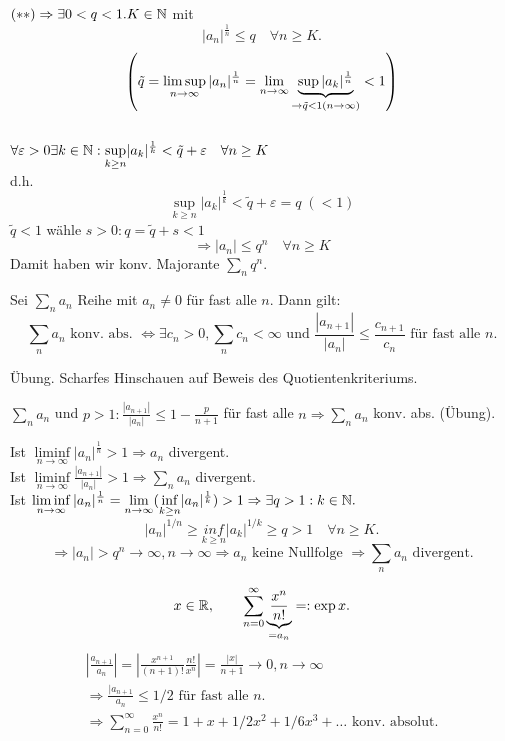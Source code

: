 \begin{bew}
	\( (**) \Rightarrow \exists 0<q<1. K\in\mathbb{N} \) mit \[ |a_n|^{\frac{1}{n}} \leq q \quad\forall n\geq K. \]
	\[\left(\tilde{q} = \limsup \limits_{n\rightarrow\infty} |a_n|^{\frac{1}{n}} = \lim\limits_{n\rightarrow\infty} \underbrace{\sup |a_k|^{\frac{1}{n}}}_{\rightarrow \tilde{q} < 1 (n \rightarrow \infty)}< 1\right)\]\\
	\(\forall \varepsilon > 0 \exists k \in \mathbb{N}: \underset{k \geq n}{\sup} |a_k|^{\frac{1}{k}} < \tilde{q} + \varepsilon \quad \forall n \geq K \)\\
	d.h.\\
	\[\underset{k \geq n}{\sup} |a_k|^{\frac{1}{k}} < \tilde{q} + \varepsilon = q \; (< 1)\]
	\(\tilde{q} < 1\) wähle \(s > 0: q = \tilde{q} + s < 1\)\\
	\[\Rightarrow |a_n| \leq q^n \quad \forall n \geq K \]
	Damit haben wir konv. Majorante \( \sum_n q^n \).
\end{bew}
\begin{satz}
	Sei \( \sum_n a_n \) Reihe mit \(a_n \neq 0 \) für fast alle \(n\). Dann gilt:
	\[ \sum_n a_n \text{ konv. abs. } \Leftrightarrow \exists c_n > 0, \sum_n c_n < \infty \text{ und } \frac{|a_{n+1}|}{|a_n|} \leq \frac{c_{n+1}}{c_n} \text{ für fast alle }n. \]
\end{satz}
\begin{bew}Übung.
	Scharfes Hinschauen auf Beweis des Quotientenkriteriums.
\end{bew}
\begin{kor}
	\( \sum_n a_n \) und \( p>1: \frac{|a_{n+1}|}{|a_n|} \leq 1 - \frac{p}{n+1} \) für fast alle \(n \Rightarrow \sum_n a_n \) konv. abs. (Übung).
\end{kor}
\begin{bem}
	Ist \( \liminf\limits_{n\rightarrow\infty} |a_n|^{\frac{1}{n}} > 1 \Rightarrow a_n \) divergent.\\
	Ist \( \liminf\limits_{n\rightarrow\infty} \frac{|a_{n+1}|}{|a_n|} > 1 \Rightarrow \sum_n a_n \) divergent.\\
	Ist \( \liminf\limits_{n\rightarrow\infty} |a_n|^{\frac{1}{n}} = \lim\limits_{n\rightarrow\infty}(\underset{k\geq n}{\inf} |a_n|^{\frac{1}{k}}) > 1 \Rightarrow \exists q>1: k \in\mathbb{N}.\)
	\[ |a_n|^{1/n} \geq \underset{k\geq n}{inf} |a_k|^{1/k} \geq q > 1 \quad\forall n\geq K. \]
	\[ \Rightarrow |a_n| > q^n \rightarrow \infty, n\rightarrow\infty \Rightarrow a_n \text{ keine Nullfolge } \Rightarrow \sum_n a_n \text{ divergent}. \]
\end{bem}
\begin{bsp}[Exponentialreihe]
	\[ x\in\mathbb{R},\qquad \sum_{n=0}^{\infty} \underbrace{\frac{x^n}{n!}}_{=a_n} =: \exp x. \]
	\begin{align*}
		|\frac{a_{n+1}}{a_n}| = |\frac{x^{n+1}}{(n+1)!} \frac{n!}{x^n}| = \frac{|x|}{n+1} \rightarrow 0, n\rightarrow\infty\\
		\Rightarrow \frac{|a_{n+1}}{a_n} \leq 1/2 \text{ für fast alle } n.\\
		\Rightarrow \sum_{n=0}^{\infty} \frac{x^n}{n!} = 1 + x + 1/2 x^2 + 1/6 x^3 + \dots \text{ konv. absolut.}
	\end{align*}
\end{bsp}
